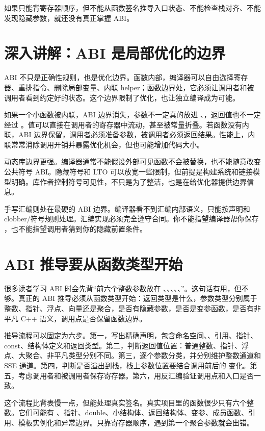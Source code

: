 如果只能背寄存器顺序，但不能从函数签名推导入口状态、不能检查栈对齐、不能发现隐藏参数，就还没有真正掌握 ABI。

\section{深入讲解：ABI 是局部优化的边界}

ABI 不只是正确性规则，也是优化边界。函数内部，编译器可以自由选择寄存器、重排指令、删除局部变量、内联 helper；函数边界处，它必须让调用者和被调用者看到约定好的状态。这个边界限制了优化，也让独立编译成为可能。

如果一个小函数被内联，ABI 边界消失，参数不一定真的放进 、，返回值也不一定经过 。值可以直接在调用者的寄存器中流动，甚至被常量折叠。若函数没有内联，ABI 边界保留，调用者必须准备参数，被调用者必须返回结果。性能上，内联常常消除调用开销并暴露优化机会，但也可能增加代码大小。

动态库边界更强。编译器通常不能假设外部可见函数不会被替换，也不能随意改变公共符号 ABI。隐藏符号和 LTO 可以放宽一些限制，但前提是构建系统和链接模型明确。库作者控制符号可见性，不只是为了整洁，也是在给优化器提供边界信息。

手写汇编则处在最硬的 ABI 边界。编译器看不到汇编内部语义，只能按声明和 clobber/符号规则处理。汇编实现必须完全遵守合同。你不能指望编译器帮你保存 ，也不能指望调用者猜到你的隐藏前置条件。

\section{ABI 推导要从函数类型开始}

很多读者学习 ABI 时会先背“前六个整数参数放在 、、、、、”。这句话有用，但不够。真正的 ABI 推导必须从函数类型开始：返回类型是什么，参数类型分别属于整数、指针、浮点、向量还是聚合，是否有隐藏参数，是否是变参函数，是否有非平凡 C++ 语义，调用点是否保留函数边界。

推导流程可以固定为六步。第一，写出精确声明，包含命名空间、、引用、指针、const、结构体定义和返回类型。第二，判断返回值位置：普通整数、指针、浮点、大聚合、非平凡类型分别不同。第三，逐个参数分类，并分别维护整数通道和 SSE 通道。第四，判断是否溢出到栈，栈上参数位置要结合调用前后的  变化。第五，考虑调用者和被调用者保存寄存器。第六，用反汇编验证调用点和入口是否一致。

这个流程比背表慢一点，但能处理真实签名。真实项目里的函数很少只有六个整数。它们可能有 、指针、double、小结构体、返回结构体、变参、成员函数、引用、模板实例化和异常边界。只靠寄存器顺序，遇到第一个聚合参数就会出错。

